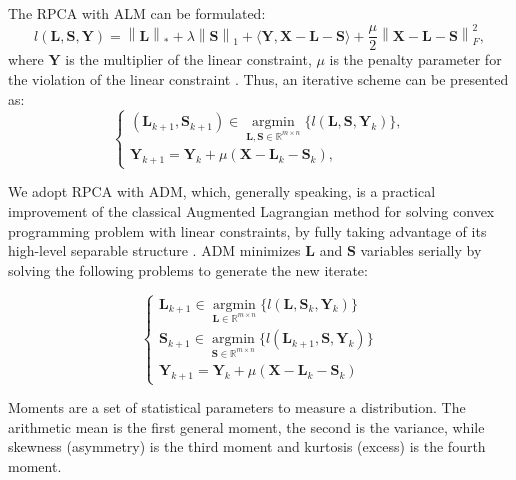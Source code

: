 The RPCA with ALM can be formulated:
\begin{equation}\label{eq:4.04}
	l(\boldsymbol{L}, \boldsymbol{S}, \boldsymbol{Y}) = \left\|\boldsymbol{L}\right\|_* + \lambda\left\|\boldsymbol{S}\right\|_1 + \langle \boldsymbol{Y, X - L - S}  \rangle + \frac{\mu}{2}\left\|\boldsymbol{X - L - S}\right\|_F^2,
\end{equation}
where $\boldsymbol{Y}$ is the multiplier of the linear constraint, $\mu$ is the penalty parameter for the violation of the linear constraint \cite{yuan2009sparse}. Thus, an iterative scheme can be presented as:
\begin{equation}\label{eq:4.05}
	\left\{
		\begin{matrix} 
			(\boldsymbol{L}_{k+1}, \boldsymbol{S}_{k+1}) \in \operatorname*{argmin}_{\boldsymbol{L,S} \in \mathbb{R}^{m \times n}} \{l(\boldsymbol{L}, \boldsymbol{S}, \boldsymbol{Y}_{k})\}, \\ 
			\boldsymbol{Y}_{k+1} = \boldsymbol{Y}_{k} + \mu(\boldsymbol{X} - \boldsymbol{L}_{k} - \boldsymbol{S}_{k}),
		\end{matrix}
	\right.
\end{equation}

We adopt RPCA with ADM, which, generally speaking, is a practical improvement of the classical Augmented Lagrangian method for solving convex programming problem with linear constraints, by fully taking advantage of its high-level separable structure \cite{yuan2009sparse}. ADM minimizes $\boldsymbol{L}$ and $\boldsymbol{S}$ variables serially by solving the following problems to generate the new iterate:

\begin{equation}\label{eq:4.06}
	\left\{\begin{matrix}
	\boldsymbol{L}_{k+1} \in \operatorname*{argmin}_{\boldsymbol{L} \in \mathbb{R}^{m \times n}}\{l(\boldsymbol{L}, \boldsymbol{S}_{k}, \boldsymbol{Y}_{k})\}\\ 
	\boldsymbol{S}_{k+1} \in \operatorname*{argmin}_{\boldsymbol{S} \in \mathbb{R}^{m \times n}}\{l(\boldsymbol{L}_{k+1}, \boldsymbol{S}, \boldsymbol{Y}_{k})\}\\ 
	\boldsymbol{Y}_{k+1} = \boldsymbol{Y}_{k} + \mu(\boldsymbol{X} - \boldsymbol{L}_{k} - \boldsymbol{S}_{k})
	\end{matrix}\right.
\end{equation}

Moments are a set of statistical parameters to measure a distribution. The arithmetic mean is the first general moment, the second is the variance, while skewness (asymmetry) is the third moment and kurtosis (excess) is the fourth moment.

